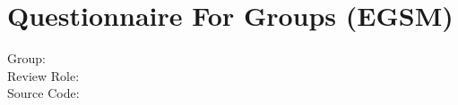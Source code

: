 
\chapter {Questionnaire For Groups (EGSM)}


\begin{description}
\item [Group:]
\item [Review Role:]
\item [Source Code:]
\end{description}

